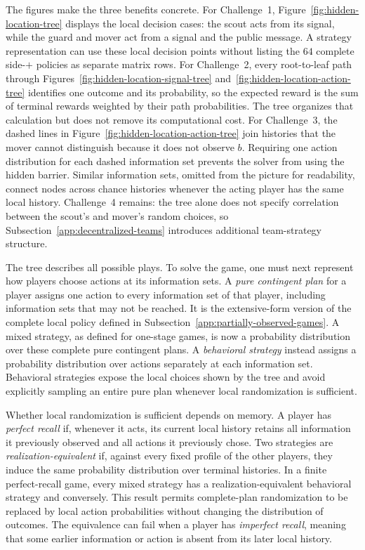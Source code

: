 \clearpage

The figures make the three benefits concrete. For Challenge~1, Figure~\ref{fig:hidden-location-tree} displays the local decision cases: the scout acts from its signal, while the guard and mover act from a signal and the public message. A strategy representation can use these local decision points without listing the $64$ complete side-$+$ policies as separate matrix rows. For Challenge~2, every root-to-leaf path through Figures~\ref{fig:hidden-location-signal-tree} and~\ref{fig:hidden-location-action-tree} identifies one outcome and its probability, so the expected reward is the sum of terminal rewards weighted by their path probabilities. The tree organizes that calculation but does not remove its computational cost. For Challenge~3, the dashed lines in Figure~\ref{fig:hidden-location-action-tree} join histories that the mover cannot distinguish because it does not observe $b$. Requiring one action distribution for each dashed information set prevents the solver from using the hidden barrier. Similar information sets, omitted from the picture for readability, connect nodes across chance histories whenever the acting player has the same local history. Challenge~4 remains: the tree alone does not specify correlation between the scout's and mover's random choices, so Subsection~\ref{app:decentralized-teams} introduces additional team-strategy structure.

The tree describes all possible plays. To solve the game, one must next represent how players choose actions at its information sets. A \emph{pure contingent plan} for a player assigns one action to every information set of that player, including information sets that may not be reached. It is the extensive-form version of the complete local policy defined in Subsection~\ref{app:partially-observed-games}. A mixed strategy, as defined for one-stage games, is now a probability distribution over these complete pure contingent plans. A \emph{behavioral strategy} instead assigns a probability distribution over actions separately at each information set. Behavioral strategies expose the local choices shown by the tree and avoid explicitly sampling an entire pure plan whenever local randomization is sufficient.

Whether local randomization is sufficient depends on memory. A player has \emph{perfect recall} if, whenever it acts, its current local history retains all information it previously observed and all actions it previously chose. Two strategies are \emph{realization-equivalent} if, against every fixed profile of the other players, they induce the same probability distribution over terminal histories. In a finite perfect-recall game, every mixed strategy has a realization-equivalent behavioral strategy and conversely. This result permits complete-plan randomization to be replaced by local action probabilities without changing the distribution of outcomes. The equivalence can fail when a player has \emph{imperfect recall}, meaning that some earlier information or action is absent from its later local history.

